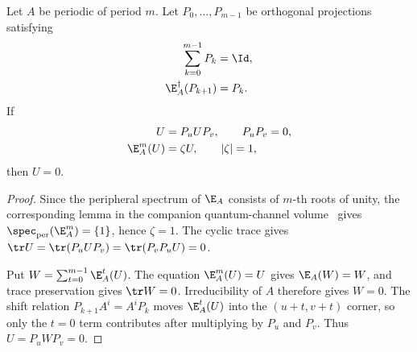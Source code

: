 \begin{lemma}
    \label{lem:offdiag_eigenvector_eq_zero_periodic}
    \leanok
    Let $A$ be periodic of period $m$. Let $P_0,\ldots,P_{m-1}$ be
    orthogonal projections satisfying
    \begin{align}
        \sum_{k=0}^{m-1}P_k   & =\Id, \notag \\
        \E_A^\dagger(P_{k+1}) & =P_k. \notag
    \end{align}
    If
    \begin{align}
        U         & =P_uUP_v,\qquad P_uP_v=0, \notag  \\
        \E_A^m(U) & =\zeta U,\qquad |\zeta|=1, \notag
    \end{align}
    then $U=0$.
\end{lemma}

\begin{proof}\leanok
    Since the peripheral spectrum of $\E_A$ consists of $m$-th roots
    of unity, the corresponding lemma in the companion quantum-channel volume~\cite[``Powering collapses peripheral eigenvalues'']{QICLean2026Blueprint} gives
    $\spec_{\mathrm{per}}(\E_A^m)=\{1\}$, hence $\zeta=1$. The cyclic trace
    gives $\tr U=\tr(P_uUP_v)=\tr(P_vP_uU)=0$.

    Put $W=\sum_{t=0}^{m-1}\E_A^t(U)$. The equation
    $\E_A^m(U)=U$ gives $\E_A(W)=W$, and trace preservation gives
    $\tr W=0$. Irreducibility of $A$ therefore gives $W=0$. The shift relation
    $P_{k+1}A^i=A^iP_k$ moves $\E_A^t(U)$ into the $(u+t,v+t)$ corner, so only
    the $t=0$ term contributes after multiplying by $P_u$ and $P_v$. Thus
    $U=P_uWP_v=0$.
\end{proof}

